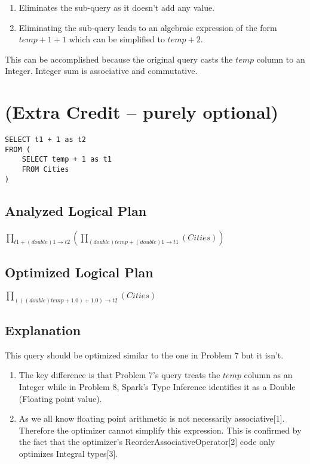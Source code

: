 \documentclass[12pt]{article}
\begin{document}
\begin{enumerate}
\item Eliminates the sub-query as it doesn't add any value.
\item Eliminating the sub-query leads to an algebraic expression of the form $temp + 1 + 1$ which can be simplified to $temp + 2$.
\end{enumerate}

This can be accomplished because the original query casts the $temp$ column to an Integer. Integer sum is associative and commutative.
\newpage

\section{(Extra Credit -- purely optional)}
\begin{verbatim}
SELECT t1 + 1 as t2
FROM (
    SELECT temp + 1 as t1
    FROM Cities
)
\end{verbatim}

\subsection*{Analyzed Logical Plan}
$\prod_{t1 + (double)1 \rightarrow t2} ( \prod_{(double) temp + (double) 1 \rightarrow t1} (Cities) )$

\subsection*{Optimized Logical Plan}
$\prod_{(((double) temp + 1.0) + 1.0) \rightarrow t2}(Cities)$

\subsection*{Explanation}

This query should be optimized similar to the one in Problem 7 but it isn't. 

\begin{enumerate}
\item The key difference is that Problem 7's query treats the $temp$ column as an Integer while in Problem 8, Spark's Type Inference identifies it as a Double (Floating point value).

\item As we all know floating point arithmetic is not necessarily associative[1]. Therefore the optimizer cannot simplify this expression. This is confirmed by the fact that the optimizer's ReorderAssociativeOperator[2] code only optimizes Integral types[3].
\end{enumerate}
\end{document}
